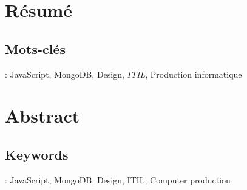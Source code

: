 \section*{Résumé} 

\lipsum[3]
\subsection*{Mots-clés} : JavaScript, MongoDB, Design, \textit{\gls{ITIL}}, Production informatique

\section*{Abstract} %

\lipsum[3]

\subsection*{Keywords} : JavaScript, MongoDB, Design, ITIL, Computer production
